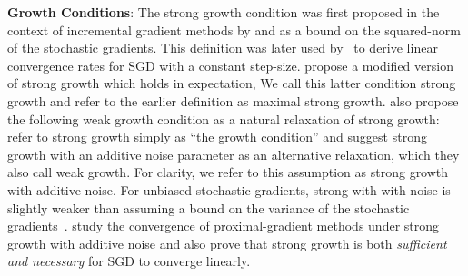 \noindent \textbf{Growth Conditions}:
The strong growth condition was first proposed in the context of incremental gradient methods by \citet{solodov1998incremental} and \citet{tseng1998incremental} as a bound on the squared-norm of the stochastic gradients.
This definition was later used by~\citet{schmidt2013fast} to derive linear convergence rates for \ac{SGD} with a constant step-size. 
\citet{vaswani2019fast} propose a modified version of strong growth which holds in expectation,
We call this latter condition strong growth and refer to the earlier definition as maximal strong growth.
\citet{vaswani2019fast} also propose the following weak growth condition as a natural relaxation of strong growth: 
\citet{cevher2018linear} refer to strong growth simply as ``the growth condition'' and suggest strong growth with an additive noise parameter as an alternative relaxation, 
which they also call weak growth.
For clarity, we refer to this assumption as strong growth with additive noise.
For unbiased stochastic gradients, strong with with noise is slightly weaker than assuming a bound on the variance of the stochastic gradients~\citep{khaled2020better, ghadimi2012optimal1}.
\citet{cevher2018linear} study the convergence of proximal-gradient methods under strong growth with additive noise and also prove that strong growth is both \emph{sufficient and necessary} for \ac{SGD} to converge linearly.\\



